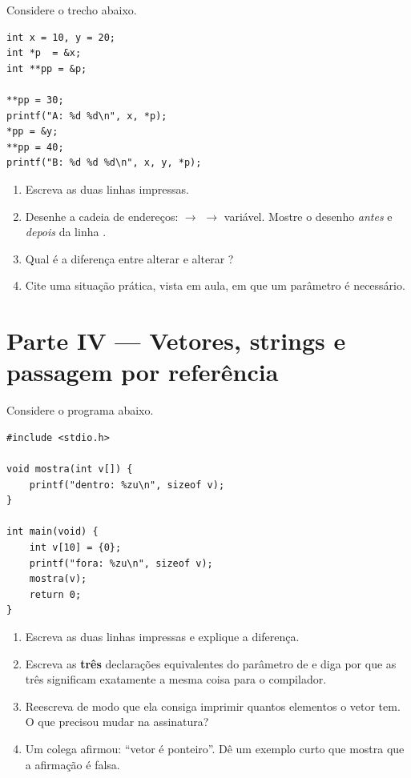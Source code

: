\documentclass[11pt,a4paper]{article}
\begin{document}
Considere o trecho abaixo.

\begin{lstlisting}
int x = 10, y = 20;
int *p  = &x;
int **pp = &p;

**pp = 30;
printf("A: %d %d\n", x, *p);
*pp = &y;
**pp = 40;
printf("B: %d %d %d\n", x, y, *p);
\end{lstlisting}

\begin{enumerate}[label=(\alph*),leftmargin=1.8em,itemsep=1pt]
  \item Escreva as duas linhas impressas.
  \item Desenhe a cadeia de endereços:  $\to$  $\to$ variável.
        Mostre o desenho \emph{antes} e \emph{depois} da linha .
  \item Qual é a diferença entre alterar  e alterar ?
  \item Cite uma situação prática, vista em aula, em que um parâmetro 
        é necessário.
\end{enumerate}

\section{Parte IV --- Vetores, strings e passagem por referência}

Considere o programa abaixo.

\begin{lstlisting}
#include <stdio.h>

void mostra(int v[]) {
    printf("dentro: %zu\n", sizeof v);
}

int main(void) {
    int v[10] = {0};
    printf("fora: %zu\n", sizeof v);
    mostra(v);
    return 0;
}
\end{lstlisting}

\begin{enumerate}[label=(\alph*),leftmargin=1.8em,itemsep=1pt]
  \item Escreva as duas linhas impressas e explique a diferença.
  \item Escreva as \textbf{três} declarações equivalentes do parâmetro de 
        e diga por que as três significam exatamente a mesma coisa para o compilador.
  \item Reescreva  de modo que ela consiga imprimir quantos elementos o
        vetor tem. O que precisou mudar na assinatura?
  \item Um colega afirmou: ``vetor é ponteiro''. Dê um exemplo curto que mostra que a
        afirmação é falsa.
\end{enumerate}
\end{document}
